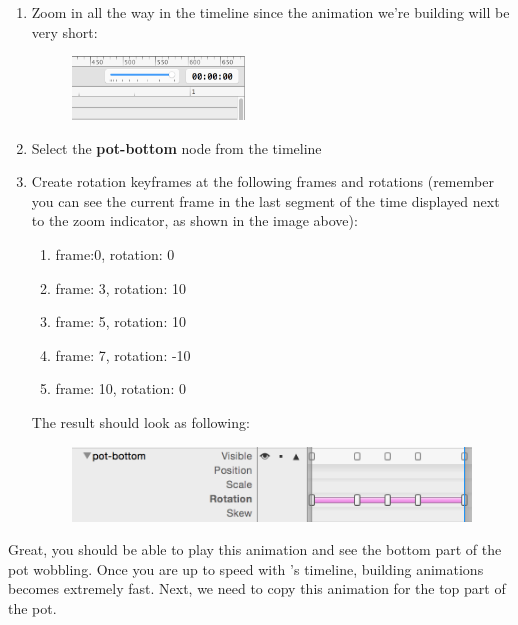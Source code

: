 \begin{leftbar}
\begin{enumerate}
  \item Zoom in all the way in the timeline since the animation we're building
  will be very short:
  \begin{figure}[H]
  \centering
  \includegraphics[width=130pt]{images/Chapter9/zoom_timeline.png}
  \end{figure}
  \item Select the \textbf{pot-bottom} node from the timeline
  \item Create rotation keyframes at the following frames and rotations
  (remember you can see the current frame in the last segment of the time
  displayed next to the zoom indicator, as shown in the image above):
  \begin{enumerate}
    \item frame:0, rotation: 0
    \item frame: 3, rotation: 10
    \item frame: 5, rotation: 10
    \item frame: 7, rotation: -10 
    \item frame: 10, rotation: 0
  \end{enumerate}
  The result should look as following:
  \begin{figure}[H]
  \centering
  \includegraphics[width=300pt]{images/Chapter9/wobble_timeline.png}
  \end{figure}
\end{enumerate}
\end{leftbar}
 
Great, you should be able to play this animation and see the bottom part of the
pot wobbling. Once you are up to speed with \SB{}'s timeline, building
animations becomes extremely fast. Next, we need to copy this animation for the
top part of the pot.

